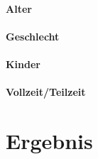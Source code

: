 
\paragraph*{Alter}


\paragraph*{Geschlecht}

\paragraph*{Kinder}

\paragraph*{Vollzeit/Teilzeit}






\section{Ergebnis}



